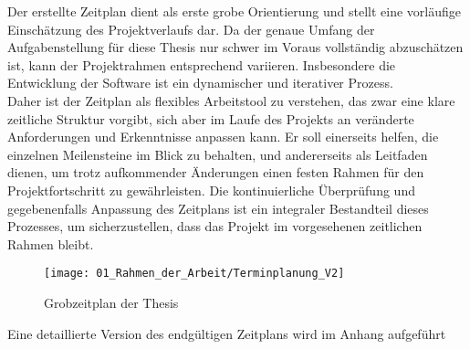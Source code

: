 	Der erstellte Zeitplan dient als erste grobe Orientierung und stellt eine vorläufige Einschätzung des Projektverlaufs dar. Da der genaue Umfang der Aufgabenstellung für diese Thesis nur schwer im Voraus vollständig abzuschätzen ist, kann der Projektrahmen entsprechend variieren. Insbesondere die Entwicklung der Software ist ein dynamischer und iterativer Prozess.
	\\
	Daher ist der Zeitplan als flexibles Arbeitstool zu verstehen, das zwar eine klare zeitliche Struktur vorgibt, sich aber im Laufe des Projekts an veränderte Anforderungen und Erkenntnisse anpassen kann. Er soll einerseits helfen, die einzelnen Meilensteine im Blick zu behalten, und andererseits als Leitfaden dienen, um trotz aufkommender Änderungen einen festen Rahmen für den Projektfortschritt zu gewährleisten. Die kontinuierliche Überprüfung und gegebenenfalls Anpassung des Zeitplans ist ein integraler Bestandteil dieses Prozesses, um sicherzustellen, dass das Projekt im vorgesehenen zeitlichen Rahmen bleibt. 

	\begin{figure}[h!]
		\centering
		\texttt{[image: 01\_Rahmen\_der\_Arbeit/Terminplanung\_V2]}
		\caption{Grobzeitplan der Thesis}
		\label{fig:Grobzeitplan}
	\end{figure}
	
	\begin{bfhNoteBox}
		Eine detaillierte Version des endgültigen Zeitplans wird im Anhang aufgeführt 
	\end{bfhNoteBox} 

		